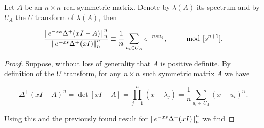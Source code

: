 \begin{lemma}  \label{lemma:quotient_norms}
    Let $A$ be an $n\times n$ real symmetric matrix. Denote by $\lambda(A)$ its spectrum and by $U_A$ the $U$ transform of $\lambda(A)$, then 

    \begin{equation*}
        \frac{\left\lVert e^{-xs}\Delta^+(xI - A)\right\rVert_n^n}{\left\lVert e^{-xs}\Delta^+(xI)\right\rVert_n^n} \equiv \frac1n\sum_{u_i \in U_A} e^{-ns u_i}, \qquad \mod [s^{n+1}]. 
    \end{equation*} 
\end{lemma}

\begin{proof}
    Suppose, without loss of generality that $A$ is positive definite. By definition of the $U$ transform, for any $n\times n$ such symmetric matrix $A$ we have

    \begin{equation*}
        \Delta^+(xI - A)^n = \det[xI - A] = \prod_{j=1}^n (x - \lambda_j) = \frac1n \sum_{u_i \in U_A} (x-u_i)^n.
    \end{equation*}

    Using this and the previously found result for $\left\lVert e^{-xs}\Delta^+(xI)\right\rVert_n^n$ we find


\end{proof}
